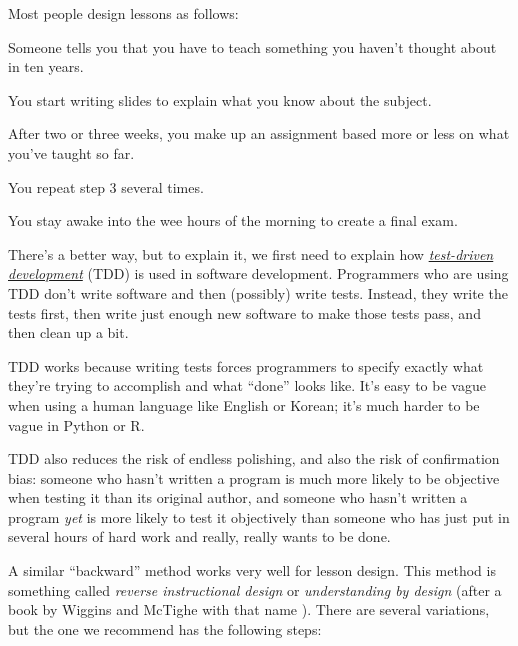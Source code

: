 
Most people design lessons as follows:

\begin{genumerate}

\item
  Someone tells you that you have to teach something you haven't
  thought about in ten years.

\item
  You start writing slides to explain what you know about the subject.

\item
  After two or three weeks, you make up an assignment based more or
  less on what you've taught so far.

\item
  You repeat step 3 several times.

\item
  You stay awake into the wee hours of the morning to create a final
  exam.

\end{genumerate}

There's a better way, but to explain it, we first need to explain how
\emph{\href{https://en.wikipedia.org/wiki/Test-driven\_development}{test-driven
development}} (TDD) is used in software development.  Programmers who
are using TDD don't write software and then (possibly) write tests.
Instead, they write the tests first, then write just enough new
software to make those tests pass, and then clean up a bit.

TDD works because writing tests forces programmers to specify exactly
what they're trying to accomplish and what ``done'' looks like. It's
easy to be vague when using a human language like English or Korean;
it's much harder to be vague in Python or R.

TDD also reduces the risk of endless polishing, and also the risk of
confirmation bias: someone who hasn't written a program is much more
likely to be objective when testing it than its original author, and
someone who hasn't written a program \emph{yet} is more likely to test
it objectively than someone who has just put in several hours of hard
work and really, really wants to be done.

A similar ``backward'' method works very well for lesson design.  This
method is something called \emph{reverse instructional design} or
\emph{understanding by design} (after a book by Wiggins and McTighe
with that name \cite{bib:wiggins-mctighe}).  There are several
variations, but the one we recommend has the following steps:

